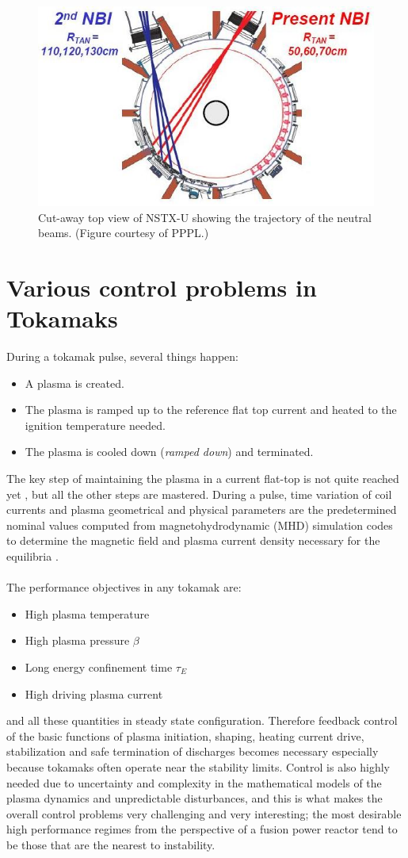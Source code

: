 \documentclass[12pt,lot, lof]{puthesis}
\begin{document}
\begin{figure}[htbp]
	\centering
	\includegraphics[width= 0.6\linewidth]{NSTXU}
	\caption{Cut-away top view of NSTX-U showing the trajectory of the neutral beams. (Figure courtesy of PPPL.)}
	\label{nstxu}
\end{figure}

\section{Various control problems in Tokamaks}

During a tokamak pulse, several things happen:
\begin{itemize}
	\item A plasma is created.
	\item The plasma is ramped up to the reference flat top current and heated to the ignition temperature needed.
	\item The plasma is cooled down (\emph{ramped down}) and terminated.
\end{itemize} 
The key step of maintaining the plasma in a current flat-top is not quite reached yet \cite{Green03}, but all the other steps are mastered. During a pulse, time variation of coil currents and plasma geometrical and physical parameters are the predetermined nominal values computed from magnetohydrodynamic (MHD) simulation codes to determine the magnetic field and plasma current density necessary for the equilibria \cite{Lao85, Takeda91, Lao05}.\\\\
%
The performance objectives in any tokamak are:
\begin{itemize}
\item High plasma temperature
\item High plasma pressure $\beta$ 
\item Long energy confinement time $\tau_E$ 
\item High driving plasma current
\end{itemize}
and all these quantities in steady state configuration. Therefore feedback control of the basic functions of plasma initiation, shaping, heating current drive, stabilization and safe termination of discharges becomes necessary especially because tokamaks often operate near the stability limits. Control is also highly needed due to uncertainty and complexity in the mathematical models of the plasma dynamics and unpredictable disturbances, and this is what makes the overall control problems very challenging and very interesting; the most desirable high performance regimes from the perspective of a fusion power reactor tend to be those that are the nearest to instability.
\end{document}
